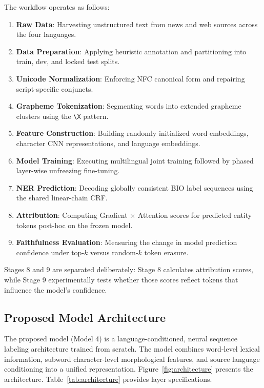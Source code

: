 \documentclass[pdflatex,sn-mathphys-num]{sn-jnl}
\begin{document}
The workflow operates as follows:
\begin{enumerate}
    \item \textbf{Raw Data}: Harvesting unstructured text from news and web sources across the four languages.
    \item \textbf{Data Preparation}: Applying heuristic annotation and partitioning into train, dev, and locked test splits.
    \item \textbf{Unicode Normalization}: Enforcing NFC canonical form and repairing script-specific conjuncts.
    \item \textbf{Grapheme Tokenization}: Segmenting words into extended grapheme clusters using the \texttt{\textbackslash X} pattern.
    \item \textbf{Feature Construction}: Building randomly initialized word embeddings, character CNN representations, and language embeddings.
    \item \textbf{Model Training}: Executing multilingual joint training followed by phased layer-wise unfreezing fine-tuning.
    \item \textbf{NER Prediction}: Decoding globally consistent BIO label sequences using the shared linear-chain CRF.
    \item \textbf{Attribution}: Computing Gradient $\times$ Attention scores for predicted entity tokens post-hoc on the frozen model.
    \item \textbf{Faithfulness Evaluation}: Measuring the change in model prediction confidence under top-$k$ versus random-$k$ token erasure.
\end{enumerate}

Stages 8 and 9 are separated deliberately: Stage 8 calculates attribution scores, while Stage 9 experimentally tests whether those scores reflect tokens that influence the model's confidence.

\subsection{Proposed Model Architecture}\label{subsec:architecture}

The proposed model (Model 4) is a language-conditioned, neural sequence labeling architecture trained from scratch. The model combines word-level lexical information, subword character-level morphological features, and source language conditioning into a unified representation. Figure~\ref{fig:architecture} presents the architecture. Table~\ref{tab:architecture} provides layer specifications.
\end{document}
